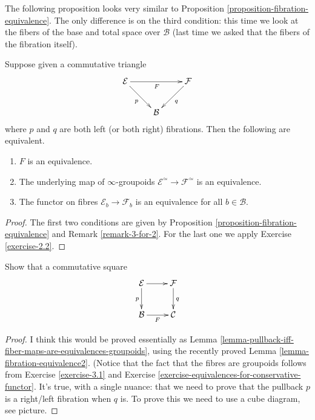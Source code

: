 \noindent
The following proposition looks very similar to
Proposition \ref{proposition-fibration-equivalence}.
The only difference is on the third condition:
this time we look at the fibers of the base
and total space over $\mathcal{B}$ 
(last time we asked that the fibers
of the fibration itself).

\begin{lemma}
\label{lemma-fibration-equivalence2}
Suppose given a commutative triangle
$$
\xymatrix{
\mathcal{E} \ar[rd]_{p} \ar[rr]_{F} && \mathcal{F} \ar[dl]^{q} \\
& \mathcal{B}
}
$$
where $p$ and $q$ are both left (or both right) fibrations.
Then the following are equivalent.
\begin{enumerate}
\item $F$ is an equivalence.
\item The underlying map of $\infty$-groupoids
$\mathcal{E}^\simeq\to\mathcal{F}^\simeq$ is an equivalence.
\item The functor on fibres $\mathcal{E}_b\to\mathcal{F}_b$
is an equivalence for all $b \in \mathcal{B}$.
\end{enumerate}
\end{lemma}

\begin{proof}
The first two conditions are given by
Proposition \ref{proposition-fibration-equivalence}
and Remark \ref{remark-3-for-2}.
For the last one we apply Exercise \ref{exercise-2.2}.
\end{proof}

\begin{exercise}
\label{exercise-pullback-iff-fiber-maps-are-equivalences}
Show that a commutative square
$$
\xymatrix{
\mathcal{E}\ar[r]\ar[d]_{p}&\mathcal{F}\ar[d]^{q}\\
\mathcal{B}\ar[r]_{F}&\mathcal{C}
}
$$
\end{exercise}

\begin{proof}
I think this would be proved
essentially as Lemma
\ref{lemma-pullback-iff-fiber-maps-are-equivalences-groupoids},
using the recently proved Lemma \ref{lemma-fibration-equivalence2}.
(Notice that the fact that the fibres are groupoids
follows from Exercise \ref{exercise-3.1} and Exercise
\ref{exercise-equivalences-for-conservative-functor}.
It's true, with a single nuance: that we need to prove that the pullback $p$ 
is a right/left fibration when $q$ is.
To prove this we need to use a cube diagram,
see picture.
\end{proof}



